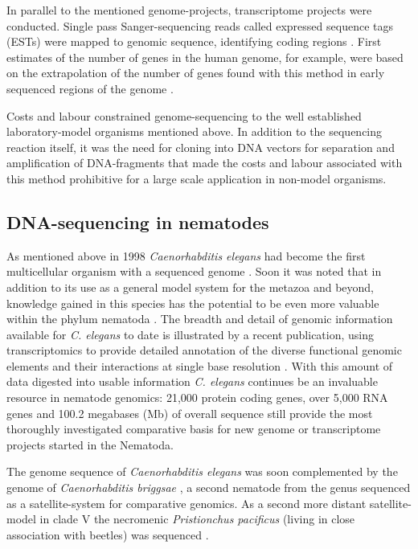 In parallel to the mentioned genome-projects, transcriptome projects
were conducted. Single pass Sanger-sequencing reads called expressed
sequence tags (ESTs) were mapped to genomic sequence, identifying
coding regions \cite{pmid2047873}. First estimates of the number of
genes in the human genome, for example, were based on the
extrapolation of the number of genes found with this method in early
sequenced regions of the genome \cite{pmid7920649}.

Costs and labour constrained genome-sequencing to the well established
laboratory-model organisms mentioned above. In addition to the
sequencing reaction itself, it was the need for cloning into DNA
vectors for separation and amplification of DNA-fragments that made
the costs and labour associated with this method prohibitive for a
large scale application in non-model organisms.

\subsection{DNA-sequencing in nematodes}
\label{sec:dna-sequ-nemat}

As mentioned above in 1998 \textit{Caenorhabditis elegans} had become
the first multicellular organism with a sequenced genome
\cite{pmid9851916}. Soon it was noted that in addition to its use as a
general model system for the metazoa and beyond, knowledge gained in
this species has the potential to be even more valuable within the
phylum nematoda \cite{blaxter_caenorhabditis_1998}. The breadth and
detail of genomic information available for \textit{C. elegans} to
date is illustrated by a recent publication, using transcriptomics to
provide detailed annotation of the diverse functional genomic elements
and their interactions at single base resolution
\cite{pmid21177976}. With this amount of data digested into usable
information \textit{C. elegans} continues be an invaluable resource in
nematode genomics: 21,000 protein coding genes, over 5,000 RNA genes
and 100.2 megabases (Mb) of overall sequence still provide the most
thoroughly investigated comparative basis for new genome or
transcriptome projects started in the Nematoda.

The genome sequence of \textit{Caenorhabditis elegans} was soon
complemented by the genome of \textit{Caenorhabditis briggsae}
\cite{stein_genome_2003}, a second nematode from the genus sequenced
as a satellite-system for comparative genomics. As a second more
distant satellite-model in clade V the necromenic \textit{Pristionchus
  pacificus} (living in close association with beetles) was sequenced
\cite{pmid18806794}.


